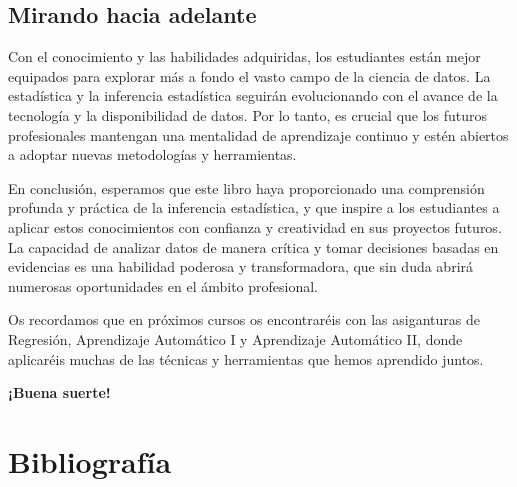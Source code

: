 \documentclass[
  letterpaper,
  DIV=11,
  numbers=noendperiod]{scrreprt}
\begin{document}
\hypertarget{mirando-hacia-adelante}{%
\section{Mirando hacia adelante}\label{mirando-hacia-adelante}}

Con el conocimiento y las habilidades adquiridas, los estudiantes están
mejor equipados para explorar más a fondo el vasto campo de la ciencia
de datos. La estadística y la inferencia estadística seguirán
evolucionando con el avance de la tecnología y la disponibilidad de
datos. Por lo tanto, es crucial que los futuros profesionales mantengan
una mentalidad de aprendizaje continuo y estén abiertos a adoptar nuevas
metodologías y herramientas.

En conclusión, esperamos que este libro haya proporcionado una
comprensión profunda y práctica de la inferencia estadística, y que
inspire a los estudiantes a aplicar estos conocimientos con confianza y
creatividad en sus proyectos futuros. La capacidad de analizar datos de
manera crítica y tomar decisiones basadas en evidencias es una habilidad
poderosa y transformadora, que sin duda abrirá numerosas oportunidades
en el ámbito profesional.

Os recordamos que en próximos cursos os encontraréis con las asiganturas
de Regresión, Aprendizaje Automático I y Aprendizaje Automático II,
donde aplicaréis muchas de las técnicas y herramientas que hemos
aprendido juntos.

\textbf{¡Buena suerte!}


\hypertarget{bibliografuxeda}{%
\chapter*{Bibliografía}\label{bibliografuxeda}}

\end{document}
